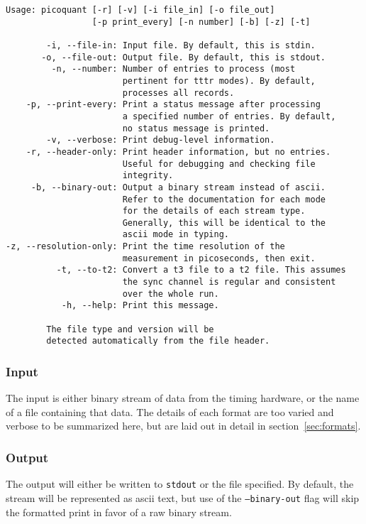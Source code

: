 \documentclass{article}
\newcommand{\stdout}{\texttt{stdout}}
\begin{document}
\begin{verbatim}
Usage: picoquant [-r] [-v] [-i file_in] [-o file_out]
                 [-p print_every] [-n number] [-b] [-z] [-t]

        -i, --file-in: Input file. By default, this is stdin.
       -o, --file-out: Output file. By default, this is stdout.
         -n, --number: Number of entries to process (most 
                       pertinent for tttr modes). By default, 
                       processes all records.
    -p, --print-every: Print a status message after processing 
                       a specified number of entries. By default,
                       no status message is printed.
        -v, --verbose: Print debug-level information.
    -r, --header-only: Print header information, but no entries. 
                       Useful for debugging and checking file 
                       integrity.
     -b, --binary-out: Output a binary stream instead of ascii. 
                       Refer to the documentation for each mode 
                       for the details of each stream type. 
                       Generally, this will be identical to the
                       ascii mode in typing.
-z, --resolution-only: Print the time resolution of the 
                       measurement in picoseconds, then exit.
          -t, --to-t2: Convert a t3 file to a t2 file. This assumes
                       the sync channel is regular and consistent
                       over the whole run.
           -h, --help: Print this message.

        The file type and version will be 
        detected automatically from the file header.
\end{verbatim}

\subsubsection{Input}
The input is either binary stream of data from the timing hardware, or the name of a file containing that data. The details of each format are too varied and verbose to be summarized here, but are laid out in detail in section~\ref{sec:formats}.

\subsubsection{Output}
The output will either be written to \stdout{} or the file specified. By default, the stream will be represented as ascii text, but use of the \texttt{--binary-out} flag will skip the formatted print in favor of a raw binary stream.
\end{document}
